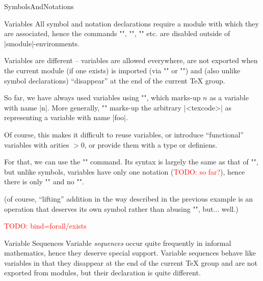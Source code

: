 \begin{smodule}[ns=https://github.com/slatex/sTeX/doc]{SymbolsAndNotations}
\begin{sfragment}{Variables}
  All symbol and notation declarations require a module with which they are associated,
  hence the commands \stexcode"\symdecl", \stexcode"\notation", \stexcode"\symdef"
  etc. are disabled outside of |smodule|-environments.

  Variables are different -- variables are allowed everywhere, are not exported when the
  current module (if one exists) is imported (via \stexcode"\importmodule" or
  \stexcode"\usemodule") and (also unlike symbol declarations) ``disappear'' at the end of
  the current \TeX\xspace group.

  \begin{function}{\svar}
    So far, we have always used variables using \stexcode"", which marks-up $n$ as
    a variable with name |n|. More generally, \stexcode"" marks-up
    the arbitrary |<texcode>| as representing a variable with name |foo|.
  \end{function}

  Of course, this makes it difficult to reuse variables, or introduce ``functional''
  variables with arities $>0$, or provide them with a type or definiens.

  \begin{function}{\vardef}
    For that, we can use the \stexcode"\vardef" command. Its syntax is largely the same as
    that of \stexcode"\symdef", but unlike symbols, variables have only one notation
    (\textcolor{red}{TODO: so far?}), hence there is only \stexcode"\vardef" and no
    \stexcode"\vardecl".
  \end{function}


(of course, ``lifting'' addition in the way described in the previous example is an
operation that deserves its own symbol rather than abusing \stexcode"\addition",
but... well.)

\textcolor{red}{TODO: bind=forall/exists}
\end{sfragment}

\begin{sfragment}{Variable Sequences}
  Variable \emph{sequences} occur quite frequently in informal mathematics, hence they
  deserve special support. Variable sequences behave like variables in that they disappear
  at the end of the current \TeX\xspace group and are not exported from modules, but their
  declaration is quite different.


\end{sfragment}
\end{smodule}
